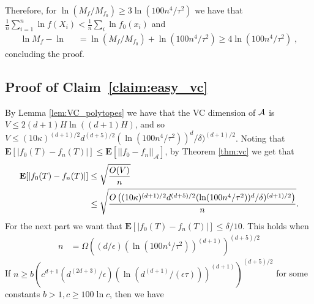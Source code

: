 \documentclass[final,12pt]{colt2018}
\newtheorem{informal theorem}[theorem]{Theorem (informal statement)}
\newcommand{\E}{\mathbf{E}}
\newcommand{\eps}{\epsilon}
\newcommand{\pmin}{\mathop{p_{\mathrm{min}}}}
\begin{document}
 {Therefore, for $\ln(M_f / M_{f_0}) \geq 3\ln(100n^4/\tau^2)$ we have that}
$
\frac{1}{n}  {\sum_{i=1}^{n} \ln f(X_i) } < \frac{1}{n} \sum_i \ln f_0(x_i)
$
 {and}
\begin{align*}
\ln M_f - \ln \pmin %
&= \ln(M_f / M_{f_0}) +  {\ln(100n^4/\tau^2)}
\geq  {4}\ln(100n^4/\tau^2) \;,
\end{align*}
concluding the proof.


\subsection{ {Proof of Claim~\ref{claim:easy_vc}}}
By Lemma \ref{lem:VC_polytopes} we have that the VC dimension of ${\cal A}$ is $V\leq 2(d+1)H \ln((d+1)H)$, and so
$V %
\leq (10 \kappa)^{(d+1)/2} d^{(d+5)/2} (\ln(100 n^4/\tau^2))^{d}/\delta)^{(d+1)/2}$.
Noting that $\E[|f_0(T)-f_n(T)|] \leq \E[||f_0 - f_n||_{\mathcal{A}}]$, by Theorem \ref{thm:vc} we get that
\begin{align}
\E[|f_0(T)-f_n(T)|]
&\leq \sqrt{\frac{O(V)}{n}} \notag \\
&\leq \sqrt{ \frac{ O\left( (10 \kappa)^{(d+1)/2} d^{(d+5)/2} (\ln(100 n^4/\tau^2))^{d}/\delta)^{(d+1)/2} \right) }{n} }. \notag
\end{align}
For the next part we want that $\E[|f_0(T)-f_n(T)|] \leq \delta / 10$.
This holds when 
\begin{align*}
n &= \Omega\left( (d/\eps) (\ln(100 n^4/\tau^2))^{(d+1)} \right)^{(d+5)/2} 
\end{align*}
If $n \geq b \left(c^{d+1} (d^{(2d+3)}/\eps) (\ln(d^{(d+1)}/(\eps\tau)))^{(d+1)}  \right)^{(d+5)/2}$ for some constants $b > 1, c \geq 100 \ln c$, then we have
\end{document}
